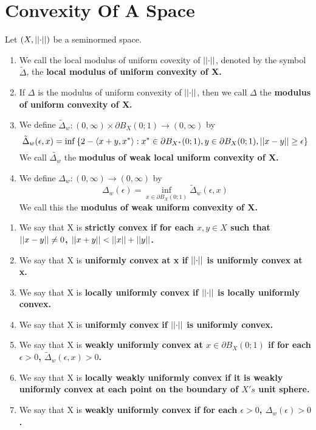 
\section{Convexity Of A Space}
\begin{df}
    Let $(X,\left|\left| \cdot \right|\right|)$ be a seminormed space. 
    \begin{enumerate}
        \item We call the local modulus of uniform covexity of $\left|\left| \cdot \right|\right|$, denoted by the symbol $\tilde{\Delta}$, the \bf local modulus of uniform convexity \rm  of X. 
        \item If $\Delta$ is the modulus of uniform convexity of $\left|\left| \cdot \right|\right|$, then we call $\Delta$ the \bf modulus of uniform convexity \rm  of X. 
        \item We define $\tilde{\Delta}_w:(0,\infty) \times \partial B_{X}(0;1) \to (0,\infty)$ by 
        \begin{equation}
            \tilde{\Delta}_w(\epsilon,x) = \inf\left\{ 2- \left\langle x+y,x^* \right\rangle : x^* \in \partial B_{X^*}(0;1),y \in \partial B_X(0;1), \left|\left| x-y \right|\right| \geq \epsilon \right\}
        \end{equation}
        We call $\tilde{\Delta_w}$ the \bf modulus of weak local uniform convexity \rm of X.
        \item We define $\Delta_w:(0,\infty) \to (0,\infty)$ by 
        \begin{equation}
            \Delta_w(\epsilon) = \inf\limits_{x \in\partial B_{X}(0;1)} \tilde{\Delta}_w(\epsilon,x)
        \end{equation}
        We call this the \bf modulus of weak uniform convexity \rm of X. 
    \end{enumerate}
    \begin{enumerate}
        \item We say that X is \bf strictly convex \rm if for each $x,y \in X$ such that $\left|\left| x-y \right|\right| \neq 0$, $\left|\left| x+y \right|\right| < \left|\left| x \right|\right|+\left|\left| y \right|\right|$. 
        \item We say that X is \bf uniformly convex at \rm x if $\left|\left| \cdot \right|\right|$ is uniformly convex at x. 
        \item We say that X is \bf locally uniformly convex \rm if $\left|\left| \cdot \right|\right|$ is locally uniformly convex. 
        \item We say that X is \bf uniformly convex \rm if $\left|\left| \cdot \right|\right|$ is uniformly convex. 
        \item We say that X is \bf weakly uniformly convex at \rm $x \in \partial B_{X}(0;1)$ if for each $\epsilon > 0$, $\tilde{\Delta}_w(\epsilon,x) > 0$.
        \item We say that X is \bf locally weakly uniformly convex \rm if it is weakly uniformly convex at each point on the boundary of $X's$ unit sphere. 
        \item We say that X is \bf weakly uniformly convex \rm if for each $\epsilon > 0$, $\Delta_w(\epsilon) > 0$. 
    \end{enumerate} 
\end{df} 
